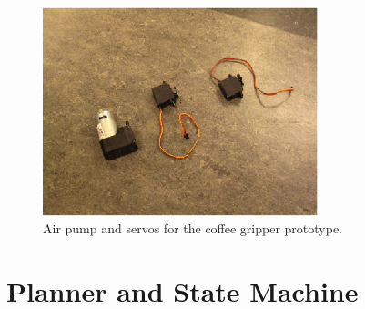 \documentclass[a4paper,10pt]{article}
\begin{document}
\begin{figure}[!]	%
\begin{center}
\includegraphics[width=8.0cm]{pump.eps}
\caption{Air pump and servos for the coffee gripper prototype.}
\label{pump} %
\end{center}
\end{figure}

\section{Planner and State Machine}
\end{document}
